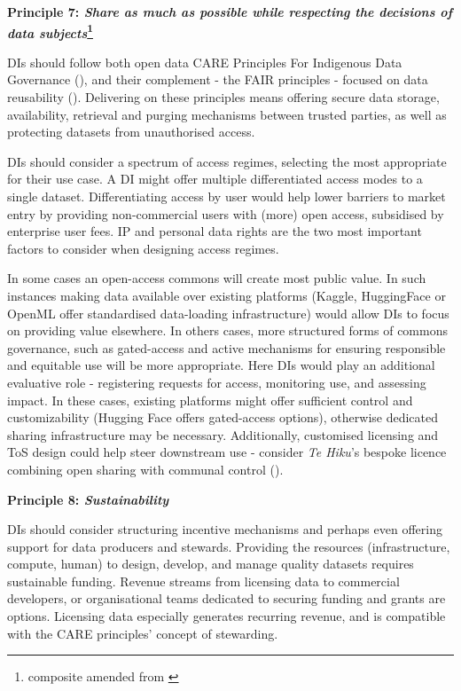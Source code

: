 \textbf{Principle 7: \textit{Share as much as possible while respecting the decisions of data subjects}\footnote{composite amended from \textcite{commons-based_data_set_governance_for_ai}}}

DIs should follow both open data CARE Principles For Indigenous Data Governance (\cite{CAREprinciples}), and their complement - the FAIR principles - focused on data reusability (\cite{FAIRPrinciples}). Delivering on these principles means offering secure data storage, availability, retrieval and purging mechanisms between trusted parties, as well as protecting datasets from unauthorised access. 

DIs should consider a spectrum of access regimes, selecting the  most appropriate for their use case. A DI might offer multiple differentiated access modes to a single dataset. Differentiating access by user would help lower barriers to market entry by providing non-commercial users with (more) open access, subsidised by enterprise user fees. IP and personal data rights are the two most important factors to consider when designing access regimes.

In some cases an open-access commons will create most public value. In such instances making data available over existing platforms (Kaggle, HuggingFace or OpenML offer standardised data-loading infrastructure) would allow DIs to focus on providing value elsewhere. In others cases, more structured forms of commons governance, such as gated-access and active mechanisms for ensuring responsible and equitable use will be more appropriate. Here DIs would play an additional evaluative role - registering requests for access, monitoring use, and assessing impact. In these cases, existing platforms might offer sufficient control and customizability (Hugging Face offers gated-access options), otherwise dedicated sharing infrastructure may be necessary. Additionally, customised licensing and ToS design could help steer downstream use - consider \textit{Te Hiku}’s bespoke licence combining open sharing with communal control (\cite{nastMaoriAreTrying}). 

\textbf{Principle 8: \textit{Sustainability}}

DIs should consider structuring incentive mechanisms and perhaps even offering support for data producers and stewards. Providing the resources (infrastructure, compute, human) to design, develop, and manage quality datasets requires sustainable funding. Revenue streams from licensing data to commercial developers, or organisational teams dedicated to securing funding and grants are options. Licensing data especially generates recurring revenue, and is compatible with the CARE principles' concept of stewarding.

